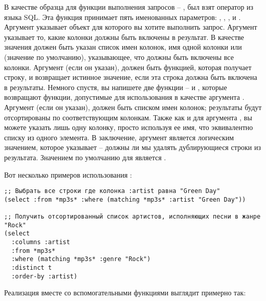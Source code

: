 В качестве образца для функции выполнения запросов --  , был взят оператор
 из языка SQL. Эта функция принимает пять именованных параметров:
, , ,  и .
Аргумент  указывает объект  для которого вы хотите выполнить
запрос.  Аргумент  указывает то, какие колонки должны быть включены в
результат.  В качестве значения должен быть указан список имен колонок, имя одной колонки
или  (значение по умолчанию), указывающее, что должны быть включены все колонки.
Аргумент  (если он указан), должен быть функцией, которая получает строку, и
возвращает истинное значение, если эта строка должна быть включена в результаты.  Немного
спустя, вы напишете две функции --  и , которые возвращают
функции, допустимые для использования в качестве аргумента .  Аргумент
 (если он указан), должен быть списком имен колонок; результаты будут
отсортированы по соответствующим колонкам.  Также как и для аргумента , вы
можете указать лишь одну колонку, просто используя ее имя, что эквивалентно списку из
одного элемента.  В заключение, аргумент  является логическим значением,
которое указывает -- должны ли мы удалять дублирующиеся строки из результата.  Значением
по умолчанию для  является .

Вот несколько примеров использования :

\begin{lstlisting}
;; Выбрать все строки где колонка :artist равна "Green Day"
(select :from *mp3s* :where (matching *mp3s* :artist "Green Day"))

;; Получить отсортированный список артистов, исполняющих песни в жанре "Rock"
(select
  :columns :artist
  :from *mp3s*
  :where (matching *mp3s* :genre "Rock")
  :distinct t
  :order-by :artist)
\end{lstlisting}

Реализация  вместе со вспомогательными функциями выглядит примерно так:

